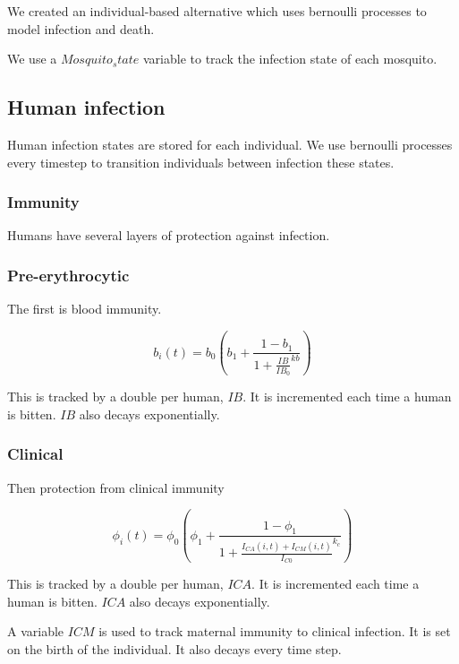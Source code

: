 \documentclass{bmcart}
\begin{document}
We created an individual-based alternative which uses bernoulli processes to model infection and death.

We use a $Mosquito_state$ variable to track the infection state of each mosquito. %


\subsection*{Human infection}

Human infection states are stored for each individual. We use bernoulli processes every timestep to transition individuals between infection these states.


\subsubsection*{Immunity}

Humans have several layers of protection against infection.

\subsubsection*{Pre-erythrocytic}

The first is blood immunity. %

\[
b_i(t) = b_0 \left( b_1 + \frac{1 - b_1}{1 + \frac{IB}{IB_0}^{kb}} \right)
\]

This is tracked by a double per human, $IB$. It is incremented each time a human is bitten. $IB$ also decays exponentially.

\subsubsection*{Clinical}

Then protection from clinical immunity %

\[
\phi_i(t) = \phi_0 \left( \phi_1 + \frac{1 - \phi_1}{1 + \frac{I_{CA}(i, t) + I_{CM}(i, t)}{I_{C0}}^{k_c}} \right)
\]

This is tracked by a double per human, $ICA$. It is incremented each time a human is bitten. $ICA$ also decays exponentially.

A variable $ICM$ is used to track maternal immunity to clinical infection. It is set on the birth of the individual. It also decays every time step.
\end{document}
